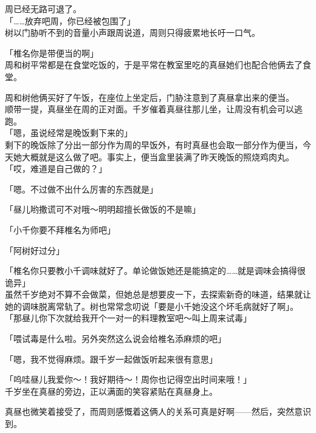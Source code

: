 周已经无路可退了。\\

「……放弃吧周，你已经被包围了」\\

树以门胁听不到的音量小声跟周说道，周则只得疲累地长吁一口气。\\

\vspace{2\baselineskip}

「椎名你是带便当的啊」\\

周和树平常都是在食堂吃饭的，于是平常在教室里吃的真昼她们也配合他俩去了食堂。

周和树他俩买好了午饭，在座位上坐定后，门胁注意到了真昼拿出来的便当。\\

顺带一提，真昼坐在周的正对面。千岁催着真昼往那儿坐，让周没有机会可以逃跑。\\

「嗯，虽说经常是晚饭剩下来的」\\

剩下的晚饭除了分出一部分作为周的早饭外，有时真昼也会取一部分作为便当，今天她大概就是这么做了吧。事实上，便当盒里装满了昨天晚饭的照烧鸡肉丸。\\

「哎，难道是自己做的？」

「嗯。不过做不出什么厉害的东西就是」

「昼儿哟撒谎可不对哦～明明超擅长做饭的不是嘛」

「小千你要不拜椎名为师吧」

「阿树好过分」

「椎名你只要教小千调味就好了。单论做饭她还是能搞定的……就是调味会搞得很诡异」\\

虽然千岁绝对不算不会做菜，但她总是想要皮一下，去探索新奇的味道，结果就让她的调味脱离常轨了。树也常常念叨说「要是小千她没这个坏毛病就好了啊」。\\

「那昼儿你下次就给我开个一对一的料理教室吧～叫上周来试毒」

「喂试毒是什么啦。另外突然这么说会给椎名添麻烦的吧」

「嗯，我不觉得麻烦。跟千岁一起做饭听起来很有意思」

「呜哇昼儿我爱你～！我好期待～！周你也记得空出时间来哦！」\\

千岁坐在真昼的旁边，正以满面的笑容紧贴在真昼身上。

真昼也微笑着接受了，而周则感慨着这俩人的关系可真是好啊——然后，突然意识到。\\

